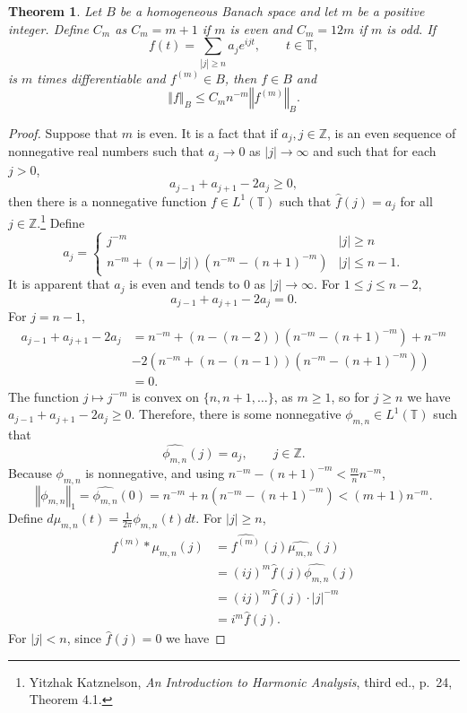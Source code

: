 \documentclass{article}
\newcommand{\norm}[1]{\left\Vert #1 \right\Vert}
\newtheorem{theorem}{Theorem}
\theoremstyle{definition}
\begin{document}
\begin{theorem}
Let $B$ be a homogeneous Banach space and let $m$ be a positive integer.
Define $C_m$ as $C_m=m+1$ if  $m$ is even and $C_m=12m$ if $m$ is odd.
If
\[
f(t)=\sum_{|j| \geq n} a_j e^{ijt}, \qquad t \in \mathbb{T},
\]
is $m$ times differentiable and $f^{(m)} \in B$, then
$f \in B$ and 
\[
\norm{f}_B \leq C_m n^{-m} \norm{f^{(m)}}_B.
\]
\end{theorem}
\begin{proof}
Suppose that $m$ is even.
It is a fact that if $a_j,  j\in \mathbb{Z}$, is an even sequence of nonnegative real numbers such that $a_j \to 0$ as $|j| \to \infty$ and 
such that for each $j>0$,
\[
a_{j-1}+a_{j+1}-2a_j \geq 0,
\]
then there is a nonnegative function $f \in L^1(\mathbb{T})$ such that
$\hat{f}(j)=a_j$ for all $j \in \mathbb{Z}$.\footnote{Yitzhak Katznelson, {\em An Introduction to Harmonic
Analysis}, third ed., p.~24, Theorem 4.1.}
Define 
\[
a_j = \begin{cases}
j^{-m}&|j| \geq n\\
n^{-m} + (n-|j|)(n^{-m}-(n+1)^{-m})&|j| \leq n-1.
\end{cases}
\]
It is apparent that $a_j$ is even and tends to $0$ as $|j| \to \infty$. For 
$1 \leq j \leq n-2$,
\[
a_{j-1}+a_{j+1}-2a_j = 0.
\]
For $j=n-1$,
\begin{align*}
a_{j-1}+a_{j+1}-2a_j &= n^{-m}+(n-(n-2))(n^{-m}-(n+1)^{-m})+n^{-m}\\
&-2\left(n^{-m} + (n-(n-1))(n^{-m}-(n+1)^{-m})\right)\\
&=0.
\end{align*}
The function $j \mapsto j^{-m}$ is convex on $\{n,n+1,\ldots\}$, as $m \geq 1$, so
for $j \geq n$ we have $a_{j-1}+a_{j+1}-2a_j \geq 0$. Therefore,
there is some nonnegative $\phi_{m,n} \in L^1(\mathbb{T})$ such that
\[
\widehat{\phi_{m,n}}(j) = a_j, \qquad j \in \mathbb{Z}.
\]
Because $\phi_{m,n}$ is nonnegative, and using
$n^{-m}-(n+1)^{-m} < \frac{m}{n} n^{-m}$,
\[
\norm{\phi_{m,n}}_1 = \widehat{\phi_{m,n}}(0) = n^{-m}+n(n^{-m}-(n+1)^{-m})
<(m+1)n^{-m}.
\]
Define $d\mu_{m,n}(t) =\frac{1}{2\pi} \phi_{m,n}(t) dt$. 
For
$|j| \geq n$,
\begin{align*}
\widehat{f^{(m)}*\mu_{m,n}}(j)&=\widehat{f^{(m)}}(j) \widehat{\mu_{m,n}}(j)\\
&=(ij)^m \hat{f}(j) \widehat{\phi_{m,n}}(j)\\
&=(ij)^m \hat{f}(j)  \cdot |j|^{-m}\\
&=i^m \hat{f}(j).
\end{align*}
For $|j|<n$, since $\hat{f}(j)=0$ we have

\end{proof}
\end{document}
